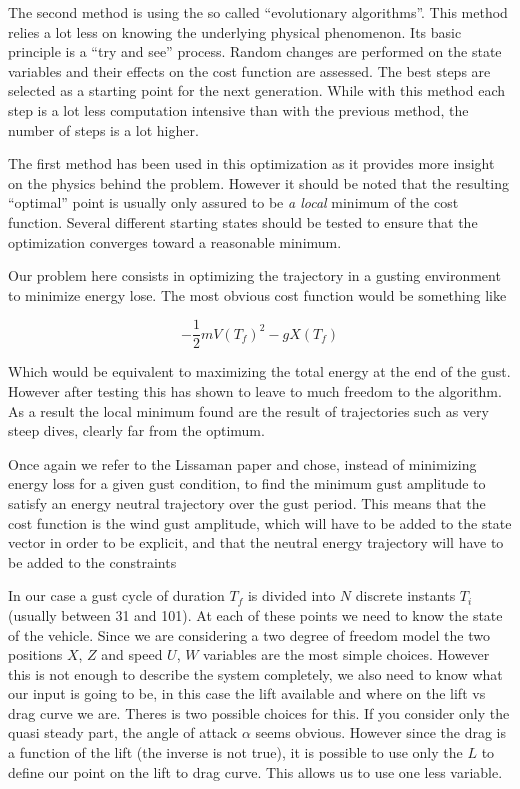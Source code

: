 \par The second method is using the so called ``evolutionary algorithms''. 
This method relies a lot less on knowing the underlying physical phenomenon.
Its basic principle is a ``try and see'' process.
Random changes are performed on the state variables and their effects on the cost function are assessed.
The best steps are selected as a starting point for the next generation.
While with this method each step is a lot less computation intensive than with the previous method, the number of steps is a lot higher.

\par The first method has been used in this optimization as it provides more insight on the physics behind the problem.
However it should be noted that the resulting ``optimal'' point is usually only assured to be \emph{a local} minimum of the cost function.
Several different starting states should be tested to ensure that the optimization converges toward a reasonable minimum.



Our problem here consists in optimizing the trajectory in a gusting environment to minimize energy lose.
The most obvious cost function would be something like

\begin{equation}
	- \frac{1}{2}m{V(T_f)}^2 - gX(T_f)
	\label{eqn:eni_cost_fun}
\end{equation}

Which would be equivalent to maximizing the total energy at the end of the gust.
However after testing this has shown to leave to much freedom to the algorithm. 
As a result the local minimum found are the result of trajectories such as very steep dives, clearly far from the optimum.

\par Once again we refer to the Lissaman paper \cite{Lissaman2007neutral} and chose, instead of minimizing energy loss for a given gust condition, to find the minimum gust amplitude to satisfy an energy neutral trajectory over the gust period.
This means that the cost function is the wind gust amplitude, which will have to be added to the state vector in order to be explicit, and that the neutral energy trajectory will have to be added to the constraints

In our case a gust cycle of duration $T_f$ is divided into $N$ discrete instants $T_i$ (usually between 31 and 101).
At each of these points we need to know the state of the vehicle.
Since we are considering a two degree of freedom model the two positions $X$, $Z$ and speed $U$, $W$ variables are the most simple choices.
However this is not enough to describe the system completely, we also need to know what our input is going to be, in this case the lift available and where on the lift vs drag curve we are.
Theres is two possible choices for this.
If you consider only the quasi steady part, the angle of attack $\alpha$ seems obvious.
However since the drag is a function of the lift (the inverse is not true), it is possible to use only the $L$ to define our point on the lift to drag curve.
This allows us to use one less variable.

